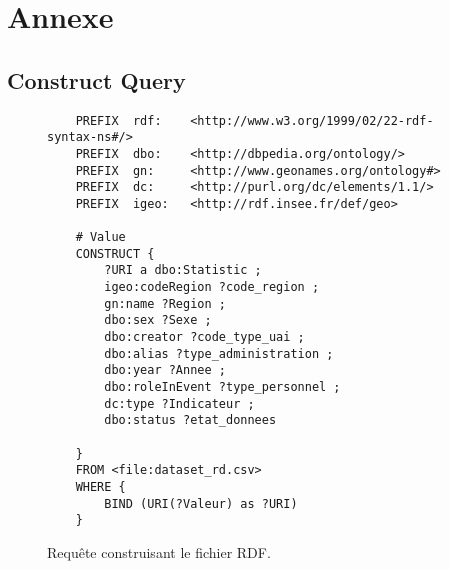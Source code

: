 \chapter{Annexe}
\section{Construct Query}
\begin{figure}[H]
\begin{lstlisting}
	PREFIX  rdf:    <http://www.w3.org/1999/02/22-rdf-syntax-ns#/>
	PREFIX  dbo:    <http://dbpedia.org/ontology/>
	PREFIX  gn:     <http://www.geonames.org/ontology#>
	PREFIX  dc:     <http://purl.org/dc/elements/1.1/>
	PREFIX  igeo:   <http://rdf.insee.fr/def/geo>

	# Value
	CONSTRUCT {
		?URI a dbo:Statistic ;
		igeo:codeRegion ?code_region ;
		gn:name ?Region ;
		dbo:sex ?Sexe ;
		dbo:creator ?code_type_uai ;
		dbo:alias ?type_administration ;
		dbo:year ?Annee ;
		dbo:roleInEvent ?type_personnel ;
		dc:type ?Indicateur ;
		dbo:status ?etat_donnees

	}
	FROM <file:dataset_rd.csv>
	WHERE {
		BIND (URI(?Valeur) as ?URI)
	}
\end{lstlisting}
\caption{Requête construisant le fichier RDF.}
\end{figure}
\label{annex:construct}